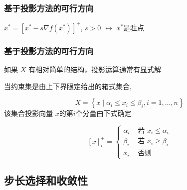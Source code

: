 \documentclass[handout,10pt]{beamer}
\begin{document}
	\begin{frame}
		\frametitle{基于投影方法的可行方向}
		$x^{*}=\left[x^{*}-s \nabla f\left(x^{*}\right)\right]^{+}$, $s>0$ $\leftrightarrow$ $x^{*}$是驻点
		
	\end{frame}
	\begin{frame}
		\frametitle{基于投影方法的可行方向}
		如果 $X$ 有相对简单的结构，投影运算通常有显式解
		
		\begin{example}
			当约束集是由上下界限定给出的箱式集合,
			
			$$
			X=\left\{x \mid \alpha_{i} \leq x_{i} \leq \beta_{i}, i=1, \ldots, n\right\}
			$$
			该集合投影向量 $x$的第$i$个分量由下式确定
			
			
			$$
			[x]_{i}^{+}=\left\{\begin{array}{ll}
				\alpha_{i} & \text { 若 } x_{i} \leq \alpha_{i} \\
				\beta_{i} & \text { 若 } x_{i} \geq \beta_{i} \\
				x_{i} & \text { 否则 }
			\end{array}\right.
			$$
		\end{example}
	\end{frame}
	\subsection{步长选择和收敛性}
	
\end{document}
